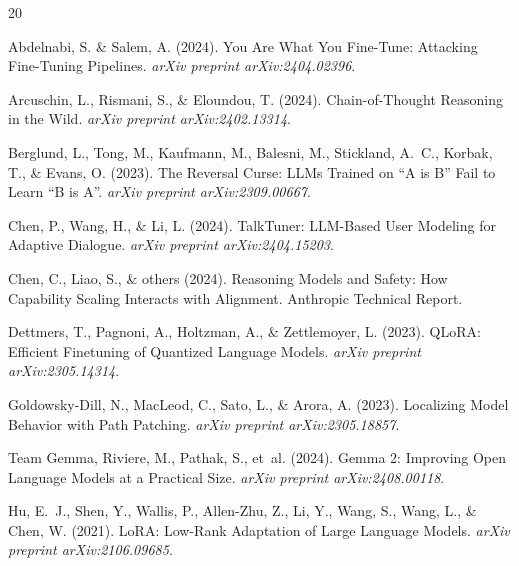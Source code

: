 \documentclass[11pt,a4paper]{article}
\begin{document}
\begin{thebibliography}{20}

Abdelnabi, S. \& Salem, A. (2024).
\newblock You Are What You Fine-Tune: Attacking Fine-Tuning Pipelines.
\newblock \textit{arXiv preprint arXiv:2404.02396}.

Arcuschin, L., Rismani, S., \& Eloundou, T. (2024).
\newblock Chain-of-Thought Reasoning in the Wild.
\newblock \textit{arXiv preprint arXiv:2402.13314}.

Berglund, L., Tong, M., Kaufmann, M., Balesni, M., Stickland, A.~C.,
Korbak, T., \& Evans, O. (2023).
\newblock The Reversal Curse: LLMs Trained on ``A is B'' Fail to Learn
``B is A''.
\newblock \textit{arXiv preprint arXiv:2309.00667}.

Chen, P., Wang, H., \& Li, L. (2024{}).
\newblock TalkTuner: LLM-Based User Modeling for Adaptive Dialogue.
\newblock \textit{arXiv preprint arXiv:2404.15203}.

Chen, C., Liao, S., \& others (2024{}).
\newblock Reasoning Models and Safety: How Capability Scaling Interacts with
Alignment.
\newblock Anthropic Technical Report.

Dettmers, T., Pagnoni, A., Holtzman, A., \& Zettlemoyer, L. (2023).
\newblock QLoRA: Efficient Finetuning of Quantized Language Models.
\newblock \textit{arXiv preprint arXiv:2305.14314}.

Goldowsky-Dill, N., MacLeod, C., Sato, L., \& Arora, A. (2023).
\newblock Localizing Model Behavior with Path Patching.
\newblock \textit{arXiv preprint arXiv:2305.18857}.

Team Gemma, Riviere, M., Pathak, S., et~al. (2024).
\newblock Gemma 2: Improving Open Language Models at a Practical Size.
\newblock \textit{arXiv preprint arXiv:2408.00118}.

Hu, E.~J., Shen, Y., Wallis, P., Allen-Zhu, Z., Li, Y., Wang, S.,
Wang, L., \& Chen, W. (2021).
\newblock LoRA: Low-Rank Adaptation of Large Language Models.
\newblock \textit{arXiv preprint arXiv:2106.09685}.


\end{thebibliography}
\end{document}
